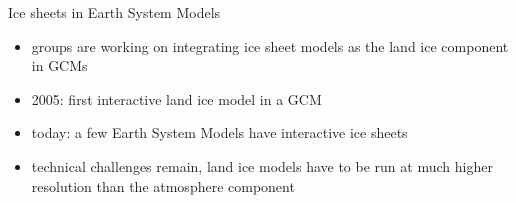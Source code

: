 \documentclass[hide notes,intlimits]{beamer}
\def\shadowshift{3pt,-3pt}
\def\shadowradius{6pt}
\newcommand\drawshadow[1]{
    \begin{pgfonlayer}{shadow}
        \shade[outercolor,inner color=innercolor,outer color=outercolor] ($(#1.south west)+(\shadowshift)+(\shadowradius/2,\shadowradius/2)$) circle (\shadowradius);
        \shade[outercolor,inner color=innercolor,outer color=outercolor] ($(#1.north west)+(\shadowshift)+(\shadowradius/2,-\shadowradius/2)$) circle (\shadowradius);
        \shade[outercolor,inner color=innercolor,outer color=outercolor] ($(#1.south east)+(\shadowshift)+(-\shadowradius/2,\shadowradius/2)$) circle (\shadowradius);
        \shade[outercolor,inner color=innercolor,outer color=outercolor] ($(#1.north east)+(\shadowshift)+(-\shadowradius/2,-\shadowradius/2)$) circle (\shadowradius);
        \shade[top color=innercolor,bottom color=outercolor] ($(#1.south west)+(\shadowshift)+(\shadowradius/2,-\shadowradius/2)$) rectangle ($(#1.south east)+(\shadowshift)+(-\shadowradius/2,\shadowradius/2)$);
        \shade[left color=innercolor,right color=outercolor] ($(#1.south east)+(\shadowshift)+(-\shadowradius/2,\shadowradius/2)$) rectangle ($(#1.north east)+(\shadowshift)+(\shadowradius/2,-\shadowradius/2)$);
        \shade[bottom color=innercolor,top color=outercolor] ($(#1.north west)+(\shadowshift)+(\shadowradius/2,-\shadowradius/2)$) rectangle ($(#1.north east)+(\shadowshift)+(-\shadowradius/2,\shadowradius/2)$);
        \shade[outercolor,right color=innercolor,left color=outercolor] ($(#1.south west)+(\shadowshift)+(-\shadowradius/2,\shadowradius/2)$) rectangle ($(#1.north west)+(\shadowshift)+(\shadowradius/2,-\shadowradius/2)$);
        \filldraw ($(#1.south west)+(\shadowshift)+(\shadowradius/2,\shadowradius/2)$) rectangle ($(#1.north east)+(\shadowshift)-(\shadowradius/2,\shadowradius/2)$);
    \end{pgfonlayer}
}
\newlength\mylen
\newcommand\shadowimage[2][]{%
\setbox0=\hbox{\texttt{[image: \#2]}}
\setlength\mylen{\wd0}
\ifnum\mylen<\ht0
\setlength\mylen{\ht0}
\fi
\divide \mylen by 120
\def\shadowshift{\mylen,-\mylen}
\def\shadowradius{\the\dimexpr\mylen+\mylen+\mylen\relax}
\begin{tikzpicture}
\node[anchor=south west,inner sep=0] (image) at (0,0) {\texttt{[image: \#2]}};
\drawshadow{image}
\end{tikzpicture}}
\begin{document}
\begin{frame}{Ice sheets in Earth System Models}
\begin{itemize}
\item groups are working on integrating ice sheet models as the land ice component in GCMs
\item 2005: first interactive land ice model in a GCM
\item today: a few Earth System Models have interactive ice sheets
\item technical challenges remain, land ice models have to be run at much higher resolution than the atmosphere component
\end{itemize}
\end{frame}



  

\end{document}
